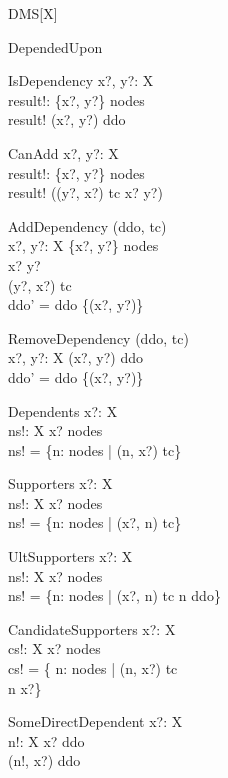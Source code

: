 \begin{class}{DMS}[X]
\begin{schema}{DependedUpon}
\end{schema}
\begin{schema}{IsDependency}
  x?, y?:  X  \\
  result!:  \bool  
\where
  \{x?, y?\} \subseteq nodes \\ 
  result! \iff (x?, y?) \in ddo 
\end{schema}
\begin{schema}{CanAdd}
  x?, y?:  X  \\
  result!:  \bool  
\where
  \{x?, y?\} \subseteq nodes \\ 
  result! \iff ((y?, x?) \notin tc \land x? \neq y?)
\end{schema}
\begin{schema}{AddDependency}
  \Delta (ddo, tc)\\
  x?, y?:  X  
\where
  \{x?, y?\} \subseteq nodes \\
  x? \neq y? \\
  (y?, x?) \notin tc \\ 
  ddo' = ddo \cup \{(x?, y?)\}
\end{schema}
\begin{schema}{RemoveDependency}
  \Delta (ddo, tc)\\
  x?, y?:  X  
\where
  (x?, y?) \in ddo \\ 
  ddo' = ddo \setminus \{(x?, y?)\}
\end{schema}
\begin{schema}{Dependents}
  x?:  X  \\
  ns!:  \finset  X  
\where
  x? \in nodes \\ 
  ns! = \{n: nodes | (n, x?) \in tc\}
\end{schema}
\begin{schema}{Supporters}
  x?:  X  \\
  ns!: \finset  X  
\where
  x? \in nodes \\ 
  ns! = \{n: nodes | (x?, n) \in tc\}
\end{schema}
\begin{schema}{UltSupporters}
  x?:  X  \\
  ns!: \finset  X  
\where
  x? \in nodes \\ 
  ns! = \{n: nodes | (x?, n) \in tc \land n \notin  \dom ddo\}
\end{schema}
\begin{schema}{CandidateSupporters}
  x?:  X  \\
  cs!:  \finset  X 
\where
  x? \in nodes \\ 
  cs! = \{ n: nodes | (n, x?) \notin tc \land \\ n \neq x?\}
\end{schema}
\begin{schema}{SomeDirectDependent}
  x?:  X  \\
  n!:  X  
\where
  x? \in  \ran ddo \\ 
  (n!, x?) \in ddo
\end{schema} 
\end{class} 

